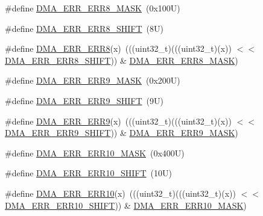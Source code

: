 \begin{DoxyCompactItemize}
\#define \mbox{\hyperlink{group___d_m_a___register___masks_ga26b3300af4c6056fde15d7ee464fe27b}{D\+M\+A\+\_\+\+E\+R\+R\+\_\+\+E\+R\+R8\+\_\+\+M\+A\+SK}}~(0x100\+U)
\item 
\#define \mbox{\hyperlink{group___d_m_a___register___masks_ga4b65d94f8709efa99e181d39498bf7f8}{D\+M\+A\+\_\+\+E\+R\+R\+\_\+\+E\+R\+R8\+\_\+\+S\+H\+I\+FT}}~(8\+U)
\item 
\#define \mbox{\hyperlink{group___d_m_a___register___masks_gaf3bae51cc5b5632d5733c9c2476e7622}{D\+M\+A\+\_\+\+E\+R\+R\+\_\+\+E\+R\+R8}}(x)~(((uint32\+\_\+t)(((uint32\+\_\+t)(x)) $<$$<$ \mbox{\hyperlink{group___d_m_a___register___masks_ga4b65d94f8709efa99e181d39498bf7f8}{D\+M\+A\+\_\+\+E\+R\+R\+\_\+\+E\+R\+R8\+\_\+\+S\+H\+I\+FT}})) \& \mbox{\hyperlink{group___d_m_a___register___masks_ga26b3300af4c6056fde15d7ee464fe27b}{D\+M\+A\+\_\+\+E\+R\+R\+\_\+\+E\+R\+R8\+\_\+\+M\+A\+SK}})
\item 
\#define \mbox{\hyperlink{group___d_m_a___register___masks_gadbe1957b7eb3286c59843176e53f8db5}{D\+M\+A\+\_\+\+E\+R\+R\+\_\+\+E\+R\+R9\+\_\+\+M\+A\+SK}}~(0x200\+U)
\item 
\#define \mbox{\hyperlink{group___d_m_a___register___masks_ga23013d455c522ab79cea06ec7cb24f54}{D\+M\+A\+\_\+\+E\+R\+R\+\_\+\+E\+R\+R9\+\_\+\+S\+H\+I\+FT}}~(9\+U)
\item 
\#define \mbox{\hyperlink{group___d_m_a___register___masks_gadf3a94617e5c64d613786441ea318adb}{D\+M\+A\+\_\+\+E\+R\+R\+\_\+\+E\+R\+R9}}(x)~(((uint32\+\_\+t)(((uint32\+\_\+t)(x)) $<$$<$ \mbox{\hyperlink{group___d_m_a___register___masks_ga23013d455c522ab79cea06ec7cb24f54}{D\+M\+A\+\_\+\+E\+R\+R\+\_\+\+E\+R\+R9\+\_\+\+S\+H\+I\+FT}})) \& \mbox{\hyperlink{group___d_m_a___register___masks_gadbe1957b7eb3286c59843176e53f8db5}{D\+M\+A\+\_\+\+E\+R\+R\+\_\+\+E\+R\+R9\+\_\+\+M\+A\+SK}})
\item 
\#define \mbox{\hyperlink{group___d_m_a___register___masks_gaf262602fbf5a06efce5d26c049d799e6}{D\+M\+A\+\_\+\+E\+R\+R\+\_\+\+E\+R\+R10\+\_\+\+M\+A\+SK}}~(0x400\+U)
\item 
\#define \mbox{\hyperlink{group___d_m_a___register___masks_ga121c9024d0acc3936d38c00f707e94d9}{D\+M\+A\+\_\+\+E\+R\+R\+\_\+\+E\+R\+R10\+\_\+\+S\+H\+I\+FT}}~(10\+U)
\item 
\#define \mbox{\hyperlink{group___d_m_a___register___masks_ga5d102fb47042207c1824f41ccff61e53}{D\+M\+A\+\_\+\+E\+R\+R\+\_\+\+E\+R\+R10}}(x)~(((uint32\+\_\+t)(((uint32\+\_\+t)(x)) $<$$<$ \mbox{\hyperlink{group___d_m_a___register___masks_ga121c9024d0acc3936d38c00f707e94d9}{D\+M\+A\+\_\+\+E\+R\+R\+\_\+\+E\+R\+R10\+\_\+\+S\+H\+I\+FT}})) \& \mbox{\hyperlink{group___d_m_a___register___masks_gaf262602fbf5a06efce5d26c049d799e6}{D\+M\+A\+\_\+\+E\+R\+R\+\_\+\+E\+R\+R10\+\_\+\+M\+A\+SK}})
$$
\end{DoxyCompactItemize}
